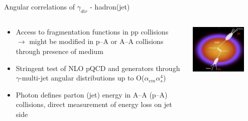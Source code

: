 \documentclass[aspectratio=169,10pt]{beamer}
\begin{document}
  \begin{frame}{Angular correlations of $\gamma_{dir}$ - hadron(jet)}
    \begin{columns}
      \begin{column}{8cm}
        \begin{itemize}
          \itemsep12pt
         \item Access to fragmentation functions in pp collisions\\
               $\rightarrow$ might be modified in p--A or A--A collisions through presence of medium
         \item Stringent test of NLO pQCD and generators through $\gamma$-multi-jet angular distributions up to O($\alpha_{em}\alpha^4_{s}$)
         \item Photon defines parton (jet) energy in A--A (p--A) collisions, direct measurement of energy loss on jet side
        \end{itemize}
        
      \end{column}
      \begin{column}{7cm}
        \includegraphics[width=0.8\textwidth]{EMLectureWeek2018/gammaHadCorr.jpeg}
      \end{column}
    \end{columns}
  \end{frame}
\end{document}
